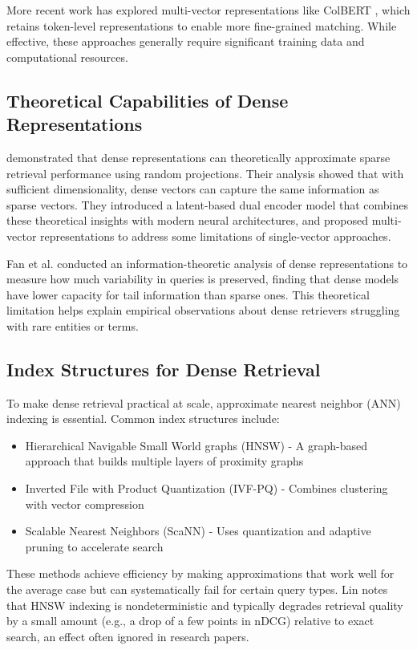 \documentclass[sigconf,review]{acmart}
\begin{document}
More recent work has explored multi-vector representations like ColBERT \cite{khattab2020colbert}, which retains token-level representations to enable more fine-grained matching. While effective, these approaches generally require significant training data and computational resources.

\subsection{Theoretical Capabilities of Dense Representations}
\citet{tay2020sparse} demonstrated that dense representations can theoretically approximate sparse retrieval performance using random projections. Their analysis showed that with sufficient dimensionality, dense vectors can capture the same information as sparse vectors. They introduced a latent-based dual encoder model that combines these theoretical insights with modern neural architectures, and proposed multi-vector representations to address some limitations of single-vector approaches.

Fan et al. \cite{fan2022information} conducted an information-theoretic analysis of dense representations to measure how much variability in queries is preserved, finding that dense models have lower capacity for tail information than sparse ones. This theoretical limitation helps explain empirical observations about dense retrievers struggling with rare entities or terms.

\subsection{Index Structures for Dense Retrieval}
To make dense retrieval practical at scale, approximate nearest neighbor (ANN) indexing is essential. Common index structures include:
\begin{itemize}
\item Hierarchical Navigable Small World graphs (HNSW) - A graph-based approach that builds multiple layers of proximity graphs
\item Inverted File with Product Quantization (IVF-PQ) - Combines clustering with vector compression
\item Scalable Nearest Neighbors (ScaNN) - Uses quantization and adaptive pruning to accelerate search
\end{itemize}

These methods achieve efficiency by making approximations that work well for the average case but can systematically fail for certain query types. Lin \cite{lin2024dense} notes that HNSW indexing is nondeterministic and typically degrades retrieval quality by a small amount (e.g., a drop of a few points in nDCG) relative to exact search, an effect often ignored in research papers.
\end{document}
